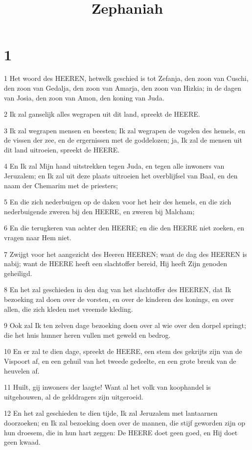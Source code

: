 

\title{Zephaniah}



\chapter{1}

\par 1 Het woord des HEEREN, hetwelk geschied is tot Zefanja, den zoon van Cuschi, den zoon van Gedalja, den zoon van Amarja, den zoon van Hizkia; in de dagen van Josia, den zoon van Amon, den koning van Juda.
\par 2 Ik zal ganselijk alles wegrapen uit dit land, spreekt de HEERE.
\par 3 Ik zal wegrapen mensen en beesten; Ik zal wegrapen de vogelen des hemels, en de vissen der zee, en de ergernissen met de goddelozen; ja, Ik zal de mensen uit dit land uitroeien, spreekt de HEERE.
\par 4 En Ik zal Mijn hand uitstrekken tegen Juda, en tegen alle inwoners van Jeruzalem; en Ik zal uit deze plaats uitroeien het overblijfsel van Baal, en den naam der Chemarim met de priesters;
\par 5 En die zich nederbuigen op de daken voor het heir des hemels, en die zich nederbuigende zweren bij den HEERE, en zweren bij Malcham;
\par 6 En die terugkeren van achter den HEERE; en die den HEERE niet zoeken, en vragen naar Hem niet.
\par 7 Zwijgt voor het aangezicht des Heeren HEEREN; want de dag des HEEREN is nabij; want de HEERE heeft een slachtoffer bereid, Hij heeft Zijn genoden geheiligd.
\par 8 En het zal geschieden in den dag van het slachtoffer des HEEREN, dat Ik bezoeking zal doen over de vorsten, en over de kinderen des konings, en over allen, die zich kleden met vreemde kleding.
\par 9 Ook zal Ik ten zelven dage bezoeking doen over al wie over den dorpel springt; die het huis hunner heren vullen met geweld en bedrog.
\par 10 En er zal te dien dage, spreekt de HEERE, een stem des gekrijts zijn van de Vispoort af, en een gehuil van het tweede gedeelte, en een grote breuk van de heuvelen af.
\par 11 Huilt, gij inwoners der laagte! Want al het volk van koophandel is uitgehouwen, al de gelddragers zijn uitgeroeid.
\par 12 En het zal geschieden te dien tijde, Ik zal Jeruzalem met lantaarnen doorzoeken; en Ik zal bezoeking doen over de mannen, die stijf geworden zijn op hun droesem, die in hun hart zeggen: De HEERE doet geen goed, en Hij doet geen kwaad.
